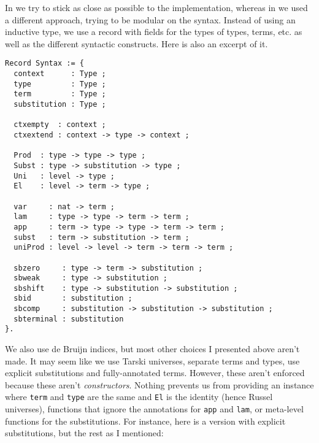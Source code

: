 In \MetaCoq we try to stick as close as possible to the \Coq implementation,
whereas in \ftt we used a different approach, trying to be modular on the
syntax. Instead of using an inductive type, we use a record with fields for the
types of types, terms, etc. as well as the different syntactic constructs.
Here is also an excerpt of it.
\begin{verbatim}
Record Syntax := {
  context      : Type ;
  type         : Type ;
  term         : Type ;
  substitution : Type ;

  ctxempty  : context ;
  ctxextend : context -> type -> context ;

  Prod  : type -> type -> type ;
  Subst : type -> substitution -> type ;
  Uni   : level -> type ;
  El    : level -> term -> type ;

  var     : nat -> term ;
  lam     : type -> type -> term -> term ;
  app     : term -> type -> type -> term -> term ;
  subst   : term -> substitution -> term ;
  uniProd : level -> level -> term -> term -> term ;

  sbzero     : type -> term -> substitution ;
  sbweak     : type -> substitution ;
  sbshift    : type -> substitution -> substitution ;
  sbid       : substitution ;
  sbcomp     : substitution -> substitution -> substitution ;
  sbterminal : substitution
}.
\end{verbatim}
We also use de Bruijn indices, but most other choices I presented above aren't
made. It may seem like we use Tarski universes, separate terms and types, use
explicit substitutions and fully-annotated terms.
However, these aren't enforced because these aren't \emph{constructors}.
Nothing prevents us from providing an instance where \texttt{term}
and \texttt{type} are the same and \texttt{El} is the identity
(hence Russel universes), functions that ignore the annotations for
\texttt{app} and \texttt{lam}, or meta-level functions for
the substitutions.
For instance, here is a version with explicit substitutions, but the rest as I
mentioned:
